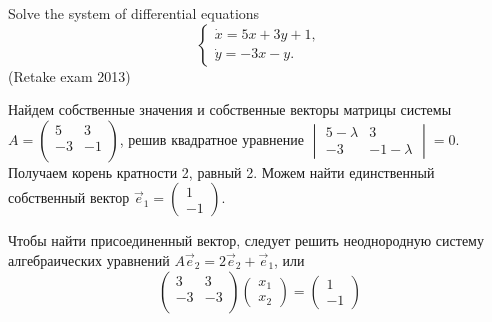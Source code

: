 \begin{problem}
Solve the system of differential equations
\[
\begin{cases}
\dot{x}=5x+3y+1, \\
\dot{y}=-3x-y.
\end{cases}
\]
(Retake exam 2013)



\begin{sol}
Найдем собственные значения и собственные векторы матрицы системы
$A=\begin{pmatrix}
5 & 3 \\
-3 & -1 \\
\end{pmatrix}$, решив квадратное уравнение
$
\begin{vmatrix}
5-\lambda & 3 \\
-3 & -1-\lambda
\end{vmatrix} = 0
$.
Получаем корень кратности 2, равный 2. Можем найти единственный собственный вектор  $\vec{e}_1=\begin{pmatrix}
1 \\
-1
\end{pmatrix}$.


Чтобы найти присоединенный вектор, следует решить неоднородную систему алгебраических уравнений $A\vec{e}_2=2\vec{e}_2+\vec{e}_1$, или
\[
\begin{pmatrix}
3 & 3 \\
-3 & -3 \\
\end{pmatrix}
\begin{pmatrix}
x_1 \\
x_2
\end{pmatrix} =
\begin{pmatrix}
1 \\
-1
\end{pmatrix}
\]



\end{sol}
\end{problem}
